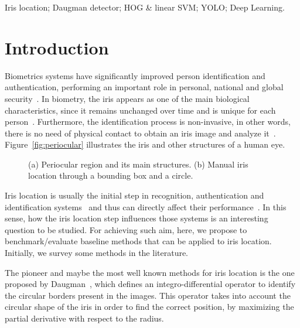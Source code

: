 \documentclass[conference]{IEEEtran}
\begin{document}
\begin{IEEEkeywords}
Iris location; Daugman detector; HOG \& linear SVM; YOLO; Deep Learning.
\end{IEEEkeywords}


\IEEEpeerreviewmaketitle


\vspace{-0.5mm}
\section{Introduction}
\label{sec:intro}

\glsresetall

Biometrics systems have significantly improved person identification and authentication, performing an important role in personal, national and global security~\cite{menotti2015deep}.
%
In biometry, the iris appears as one of the main biological characteristics, since it remains unchanged over time and is unique for each person~\cite{zhu2000biometric}. 
Furthermore, the identification process is non-invasive, in other words, there is no need of physical contact to obtain an iris image and analyze it~\cite{jain2006biometrics}.
Figure~\ref{fig:periocular} illustrates the iris and other structures of a human eye.


\begin{figure}[!htb]
	\vspace{-2.5mm}
	\centering
	 \hfill
	\caption{(a) Periocular region and its main structures. (b) Manual iris location through a bounding box and a circle.}
	\label{fig:eye}   
	\vspace{-3mm} 
\end{figure}

Iris location is usually the initial step in recognition, authentication and identification systems~\cite{daugman1993high} and thus can directly affect their performance~\cite{wildes1997iris,daugman2004iris}.
In this sense, how the iris location step influences those systems is an interesting question to be studied.
For achieving such aim, here, we propose to benchmark/evaluate baseline methods that can be applied to iris location.
Initially, we survey some methods in the literature.

The pioneer and maybe the most well known methods for iris location is the one proposed by Daugman~\cite{daugman2004iris}, which defines an integro-differential operator to identify the circular borders present in the images. 
This operator takes into account the circular shape of the iris in order to find the correct position, by maximizing the partial derivative with respect to the radius.
\end{document}
